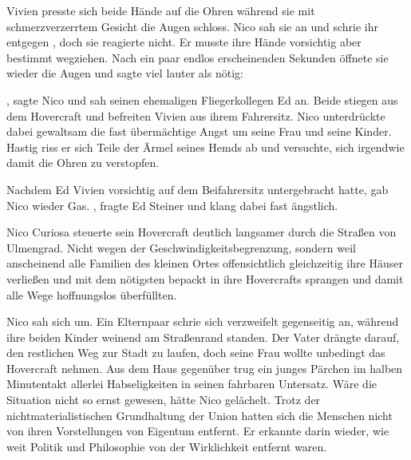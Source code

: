 Vivien presste sich beide Hände auf die Ohren während sie mit schmerzverzerrtem Gesicht die Augen schloss. Nico sah sie an und schrie ihr entgegen , doch sie reagierte nicht. Er musste ihre Hände vorsichtig aber bestimmt wegziehen. Nach ein paar endlos erscheinenden Sekunden öffnete sie wieder die Augen und sagte viel lauter als nötig: 

\par

, sagte Nico und sah seinen ehemaligen Fliegerkollegen Ed an. Beide stiegen aus dem Hovercraft und befreiten Vivien aus ihrem Fahrersitz. Nico unterdrückte dabei gewaltsam die fast übermächtige Angst um seine Frau und seine Kinder. Hastig riss er sich Teile der Ärmel seines Hemds ab und versuchte, sich irgendwie damit die Ohren zu verstopfen.

\par

Nachdem Ed Vivien vorsichtig auf dem Beifahrersitz untergebracht hatte, gab Nico wieder Gas. , fragte Ed Steiner und klang dabei fast ängstlich. 

\par

Nico Curiosa steuerte sein Hovercraft deutlich langsamer durch die Straßen von Ulmengrad. Nicht wegen der Geschwindigkeitsbegrenzung, sondern weil anscheinend alle Familien des kleinen Ortes offensichtlich gleichzeitig ihre Häuser verließen und mit dem nötigsten bepackt in ihre Hovercrafts sprangen und damit alle Wege hoffnungslos überfüllten.

\par

Nico sah sich um. Ein Elternpaar schrie sich verzweifelt gegenseitig an, während ihre beiden Kinder weinend am Straßenrand standen. Der Vater drängte darauf, den restlichen Weg zur Stadt zu laufen, doch seine Frau wollte unbedingt das Hovercraft nehmen. Aus dem Haus gegenüber trug ein junges Pärchen im halben Minutentakt allerlei Habseligkeiten in seinen fahrbaren Untersatz. Wäre die Situation nicht so ernst gewesen, hätte Nico gelächelt. Trotz der nichtmaterialistischen Grundhaltung der Union hatten sich die Menschen nicht von ihren Vorstellungen von Eigentum entfernt. Er erkannte darin wieder, wie weit Politik und Philosophie von der Wirklichkeit entfernt waren.

\par

